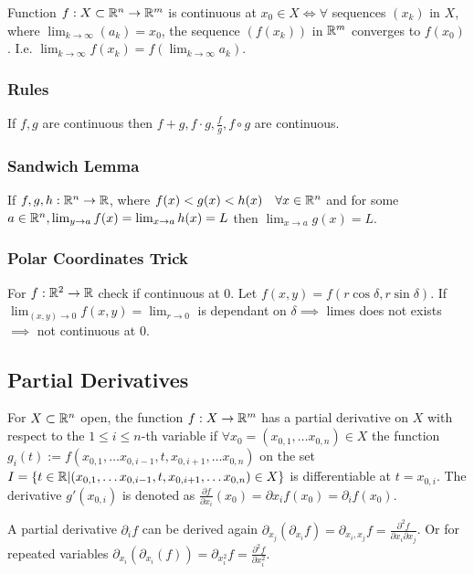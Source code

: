 Function $f: X \subset \mathbb{R}^n \to \mathbb{R}^m$ is continuous at $x_0 \in X \iff \forall$ sequences $(x_k)$ in $X$, where $\lim_{k \to \infty} (a_k) = x_0$, the sequence $(f(x_k))$ in $\mathbb{R}^m$ converges to $f(x_0)$. I.e. $\lim_{k \to \infty} f(x_k) = f(\lim_{k \to \infty} a_k)$.

\subsubsection{Rules}
If $f, g$ are continuous then $f + g, f \cdot g, \frac{f}{g}, f \circ g$ are continuous.

\subsubsection{Sandwich Lemma}
If $f, g, h: \mathbb{R}^n \to \mathbb{R}$, where $f(x) < g(x) < h(x) \quad \forall x \in \mathbb{R}^n$ and for some $a \in \mathbb{R}^n, \lim_{y \to a} f(x) = \lim_{x \to a} h(x) = L$ then $\lim_{x \to a} g(x) = L$.

\subsubsection{Polar Coordinates Trick}
For $f: \mathbb{R}^2 \to \mathbb{R}$ check if continuous at $0$. Let $f(x, y) = f(r \cos \delta, r \sin \delta)$. If $\lim_{(x, y) \to 0} f(x, y) = \lim_{r \to 0}$ is dependant on $\delta \implies$ limes does not exists $\implies$ not continuous at $0$.

\subsection{Partial Derivatives}
For $X \subset \mathbb{R}^n$ open, the function $f: X \to \mathbb{R}^m$ has a partial derivative on $X$ with respect to the $1 \le i \le n$-th variable if $\forall x_0 = (x_{0,1}, \dots x_{0,n}) \in X$ the function $g_i(t):= f(x_{0,1}, \dots x_{0, i - 1}, t, x_{0, i + 1}, \dots x_{0, n})$ on the set $I = \{t \in \mathbb{R} | (x_{0,1}, \dots x_{0, i - 1}, t, x_{0, i + 1}, \dots x_{0, n}) \in X\}$ is differentiable at $t = x_{0, i}$. The derivative $g'(x_{0,i})$ is denoted as $\frac{\partial f}{\partial x_i} (x_0) = \partial{x_i}f(x_0) = \partial_i f(x_0)$.

\begin{compactitem}
\item A partial derivative $\partial_i f$ can be derived again $\partial_{x_j} (\partial_{x_i} f) = \partial_{x_i, x_j} f = \frac{\partial^2 f}{\partial x_i \partial x_j}$. Or for repeated variables $\partial_{x_i} (\partial_{x_i} (f)) = \partial_{x^2_i} f = \frac{\partial^2 f}{\partial x^2_i}$.
\end{compactitem}

